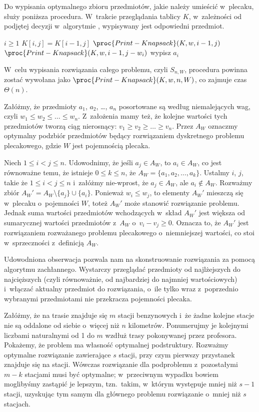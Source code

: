 Do wypisania optymalnego zbioru przedmiotów, jakie należy umieścić w~plecaku, służy poniższa procedura.
W~trakcie przeglądania tablicy $K$, w~zależności od podjętej decyzji w~algorytmie , wypisywany jest odpowiedni przedmiot.
\begin{codebox}
\li	\If $i\ge1$
\li		\Then \If $K[i,j]=K[i-1,j]$
\li				\Then $\proc{Print-Knapsack}(K,w,i-1,j)$
\li				\Else $\proc{Print-Knapsack}(K,w,i-1,j-w_i)$
\li					wypisz $a_i$
				\End
		\End
\end{codebox}
W~celu wypisania rozwiązania całego problemu, czyli $S_{n,W}$, procedura powinna zostać wywołana jako $\proc{Print-Knapsack}(K,w,n,W)$, co zajmuje czas $\Theta(n)$.

\exercise %
Załóżmy, że przedmioty $a_1$, $a_2$, \dots, $a_n$ posortowane są według niemalejących wag, czyli $w_1\le w_2\le\dots\le w_n$.
Z~założenia mamy też, że kolejne wartości tych przedmiotów tworzą ciąg nierosnący: $v_1\ge v_2\ge\dots\ge v_n$.
Przez $A_W$ oznaczmy optymalny podzbiór przedmiotów będący rozwiązaniem dyskretnego problemu plecakowego, gdzie $W$ jest pojemnością plecaka.

Niech $1\le i<j\le n$.
Udowodnimy, że jeśli $a_j\in A_W$, to $a_i\in A_W$, co jest równoważne temu, że istnieje $0\le k\le n$, że $A_W=\{a_1,a_2,\dots,a_k\}$.
Ustalmy $i$, $j$, takie że $1\le i<j\le n$ i~załóżmy nie-wprost, że $a_j\in A_W$, ale $a_i\not\in A_W$.
Rozważmy zbiór $A_W'=A_W\setminus\{a_j\}\cup\{a_i\}$.
Ponieważ $w_i\le w_j$, to elementy $A_W'$ mieszczą się w~plecaku o~pojemności $W$, toteż $A_W'$ może stanowić rozwiązanie problemu.
Jednak suma wartości przedmiotów wchodzących w~skład $A_W'$ jest większa od sumarycznej wartości przedmiotów z~$A_W$ o~$v_i-v_j\ge0$.
Oznacza to, że $A_W'$ jest rozwiązaniem rozważanego problemu plecakowego o~niemniejszej wartości, co stoi w~sprzeczności z~definicją $A_W$.

Udowodniona obserwacja pozwala nam na skonstruowanie rozwiązania za pomocą algorytmu zachłannego.
Wystarczy przeglądać przedmioty od najlżejszych do najcięższych (czyli równoważnie, od najbardziej do najmniej wartościowych) i~włączać aktualny przedmiot do rozwiązania, o~ile tylko wraz z~poprzednio wybranymi przedmiotami nie przekracza pojemności plecaka.

\exercise %
Załóżmy, że na trasie znajduje się $m$ stacji benzynowych i~że żadne kolejne stacje nie są oddalone od siebie o~więcej niż $n$ kilometrów.
Ponumerujmy je kolejnymi liczbami naturalnymi od 1 do $m$ wzdłuż trasy pokonywanej przez profesora.
Pokażemy, że problem ma własność optymalnej podstruktury.
Rozważmy optymalne rozwiązanie zawierające $s$ stacji, przy czym pierwszy przystanek znajduje się na  stacji.
Wówczas rozwiązanie dla podproblemu z~pozostałymi $m-k$ stacjami musi być optymalne; w~przeciwnym wypadku bowiem moglibyśmy zastąpić je lepszym, tzn.\ takim, w~którym występuje mniej niż $s-1$ stacji, uzyskując tym samym dla głównego problemu rozwiązanie o~mniej niż $s$ stacjach.

